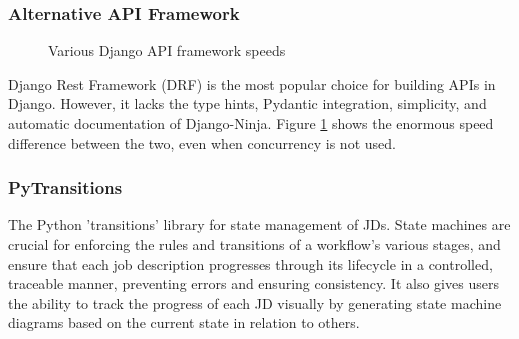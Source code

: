 \subsubsection{Alternative API Framework}
\begin{figure}[h]
\centering
{}
\vspace{-15pt}
\caption{Various Django API framework speeds}
\vspace{-10pt}
\caption*{\parencite{vitaliy_kucheryaviy_django_2024}
\label{fig:Django-Ninja-speed}}
\vspace{-5pt}
\end{figure}
Django Rest Framework (DRF) is the most popular choice for building APIs in Django. However, it lacks the type hints, Pydantic integration, simplicity, and automatic documentation of Django-Ninja. Figure \ref{fig:Django-Ninja-speed} shows the enormous speed difference between the two, even when concurrency is not used.

\subsubsection{PyTransitions}
The Python 'transitions' library for state management of JDs. State machines are crucial for enforcing the rules and transitions of a workflow's various stages, and ensure that each job description progresses through its lifecycle in a controlled, traceable manner, preventing errors and ensuring consistency. It also gives users the ability to track the progress of each JD visually by generating state machine diagrams based on the current state in relation to others.

